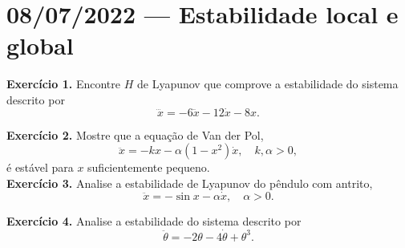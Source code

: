 \section*{08/07/2022 --- Estabilidade local e global}
\noindent\textbf{\sffamily Exercício 1.}
	Encontre $H$ de Lyapunov que comprove a estabilidade do sistema descrito por 
	\[
		\dddot{x} = -6\ddot{x} -12\dot{x} -8x.
	\]

\noindent\textbf{\sffamily Exercício 2.}
	Mostre que a equação de Van der Pol,
	\[
		\ddot{x} = -kx - \alpha(1-x^2)\dot{x},
		\quad k, \alpha>0,
	\]
	é estável para $x$ suficientemente pequeno. \\

\noindent\textbf{\sffamily Exercício 3.}
	Analise a estabilidade de Lyapunov do pêndulo com antrito,
	\[
		\ddot{x} = -\sin x -\alpha \dot{x}, \quad\alpha>0.
	\]

\noindent\textbf{\sffamily Exercício 4.}
	Analise a estabilidade do sistema descrito por
	\[
		\ddot{\theta} = -2\theta -4\dot{\theta} + \theta^3.
	\]

